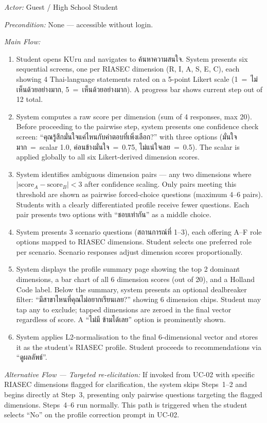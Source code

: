 \noindent\textit{Actor:} Guest / High School Student

\noindent\textit{Precondition:} None --- accessible without login.

\noindent\textit{Main Flow:}
\begin{enumerate}[leftmargin=80pt]
    \item Student opens KUru and navigates to ค้นหาความสนใจ. System presents six sequential screens, one per RIASEC dimension (R, I, A, S, E, C), each showing 4 Thai-language statements rated on a 5-point Likert scale (1~=~ไม่เห็นด้วยอย่างมาก, 5~=~เห็นด้วยอย่างมาก). A progress bar shows current step out of 12 total.
    \item System computes a raw score per dimension (sum of 4 responses, max 20). Before proceeding to the pairwise step, system presents one confidence check screen: ``คุณรู้สึกมั่นใจแค่ไหนกับคำตอบที่เพิ่งเลือก?'' with three options (มั่นใจมาก~=~scalar 1.0, ค่อนข้างมั่นใจ~=~0.75, ไม่แน่ใจเลย~=~0.5). The scalar is applied globally to all six Likert-derived dimension scores.
    \item System identifies ambiguous dimension pairs --- any two dimensions where $|\text{score}_A - \text{score}_B| < 3$ after confidence scaling. Only pairs meeting this threshold are shown as pairwise forced-choice questions (maximum 4--6 pairs). Students with a clearly differentiated profile receive fewer questions. Each pair presents two options with ``ชอบเท่ากัน'' as a middle choice.
    \item System presents 3 scenario questions (สถานการณ์ที่ 1--3), each offering A--F role options mapped to RIASEC dimensions. Student selects one preferred role per scenario. Scenario responses adjust dimension scores proportionally.
    \item System displays the profile summary page showing the top 2 dominant dimensions, a bar chart of all 6 dimension scores (out of 20), and a Holland Code label. Below the summary, system presents an optional dealbreaker filter: ``มีสาขาไหนที่คุณไม่อยากเรียนเลย?'' showing 6 dimension chips. Student may tap any to exclude; tapped dimensions are zeroed in the final vector regardless of score. A ``ไม่มี ข้ามได้เลย'' option is prominently shown.
    \item System applies L2-normalisation to the final 6-dimensional vector and stores it as the student's RIASEC profile. Student proceeds to recommendations via ``ดูผลลัพธ์''.
\end{enumerate}

\noindent\textit{Alternative Flow --- Targeted re-elicitation:} If invoked from UC-02 with specific RIASEC dimensions flagged for clarification, the system skips Steps~1--2 and begins directly at Step~3, presenting only pairwise questions targeting the flagged dimensions. Steps~4--6 run normally. This path is triggered when the student selects ``No'' on the profile correction prompt in UC-02.

